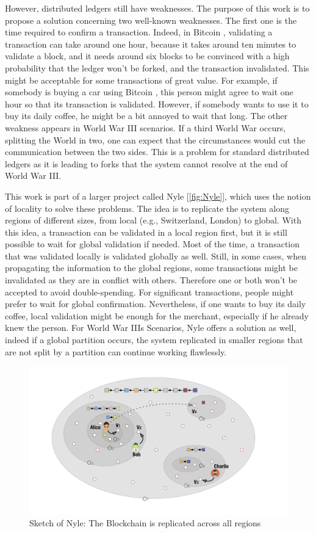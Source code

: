 \documentclass[a4paper,11pt,twoside=semi,openright]{report}
\begin{document}
However, distributed ledgers still have weaknesses. The purpose of this
work is to propose a solution concerning two well-known weaknesses. The first
one is the time required to confirm a transaction. Indeed, in Bitcoin
\cite{Nakamoto2009}, validating a transaction can take around one hour, because
it takes around ten minutes to validate a block, and it needs around six blocks
to be convinced with a high probability that the ledger won't be forked, and
the transaction invalidated. This might be acceptable for some transactions of great
value. For example, if somebody is buying a car using Bitcoin
\cite{Nakamoto2009}, this person might agree to wait one hour so that its
transaction is validated. However, if somebody wants to use it to buy its daily
coffee, he might be a bit annoyed to wait that long. The other weakness
appears in World War III scenarios. If a third World War occurs, splitting the
World in two, one can expect that the circumstances would cut the communication
between the two sides. This is a problem for standard distributed ledgers as it
is leading to forks that the system cannot resolve at the end of World War III.

This work is part of a larger project called Nyle [\autoref{fig:Nyle}], which
uses the notion of locality to solve these problems. The idea is to replicate
the system along regions of different sizes, from local (e.g., Switzerland,
London) to global.  With this idea, a transaction can be validated in a local
region first, but it is still possible to wait for global validation if needed.
Most of the time, a transaction that was validated locally is validated
globally as well. Still, in some cases, when propagating the information to the
global regions, some transactions might be invalidated as they are in conflict
with others. Therefore one or both won't be accepted to avoid double-spending.
For significant transactions, people might prefer to wait for global
confirmation. Nevertheless, if one wants to buy its daily coffee, local
validation might be enough for the merchant, especially if he already knew the
person. For World War IIIs Scenarios, Nyle offers a solution as well, indeed if
a global partition occurs, the system replicated in smaller regions that are
not split by a partition can continue working flawlessly. 

\begin{figure}[!h] \centering \includegraphics[width=400pt]{figures/Nyle}
    \caption{Sketch of Nyle: The Blockchain is replicated across all regions}
\label{fig:Nyle}
\end{figure}
\end{document}
